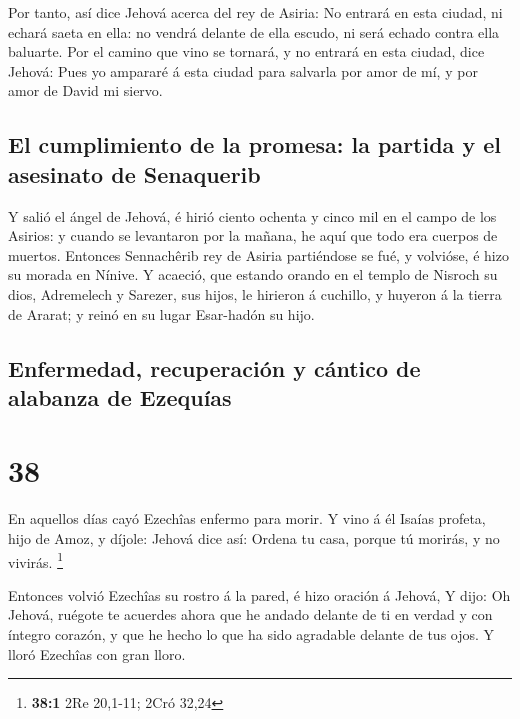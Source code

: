  Por tanto, así dice Jehová acerca del rey de Asiria: No
entrará en esta ciudad, ni echará saeta en ella: no vendrá delante de
ella escudo, ni será echado contra ella baluarte.  Por el
camino que vino se tornará, y no entrará en esta ciudad, dice Jehová:
 Pues yo ampararé á esta ciudad para salvarla por amor de
mí, y por amor de David mi siervo.

\hypertarget{el-cumplimiento-de-la-promesa-la-partida-y-el-asesinato-de-senaquerib}{%
\subsection{El cumplimiento de la promesa: la partida y el asesinato de
Senaquerib}\label{el-cumplimiento-de-la-promesa-la-partida-y-el-asesinato-de-senaquerib}}

 Y salió el ángel de Jehová, é hirió ciento ochenta y cinco
mil en el campo de los Asirios: y cuando se levantaron por la mañana, he
aquí que todo era cuerpos de muertos.  Entonces Sennachêrib
rey de Asiria partiéndose se fué, y volvióse, é hizo su morada en
Nínive.  Y acaeció, que estando orando en el templo de
Nisroch su dios, Adremelech y Sarezer, sus hijos, le hirieron á
cuchillo, y huyeron á la tierra de Ararat; y reinó en su lugar
Esar-hadón su hijo.

\hypertarget{enfermedad-recuperaciuxf3n-y-cuxe1ntico-de-alabanza-de-ezequuxedas}{%
\subsection{Enfermedad, recuperación y cántico de alabanza de
Ezequías}\label{enfermedad-recuperaciuxf3n-y-cuxe1ntico-de-alabanza-de-ezequuxedas}}

\hypertarget{section-37}{%
\section{38}\label{section-37}}

 En aquellos días cayó Ezechîas enfermo para morir. Y vino á
él Isaías profeta, hijo de Amoz, y díjole: Jehová dice así: Ordena tu
casa, porque tú morirás, y no vivirás. \footnote{\textbf{38:1} 2Re
  20,1-11; 2Cró 32,24}

 Entonces volvió Ezechîas su rostro á la pared, é hizo
oración á Jehová,  Y dijo: Oh Jehová, ruégote te acuerdes
ahora que he andado delante de ti en verdad y con íntegro corazón, y que
he hecho lo que ha sido agradable delante de tus ojos. Y lloró Ezechîas
con gran lloro.

